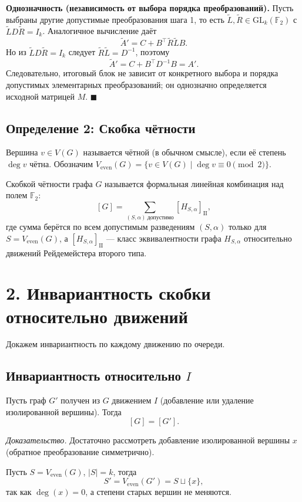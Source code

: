 \documentclass[12pt,a4paper]{article}
\begin{document}
\textbf{Однозначность (независимость от выбора порядка преобразований).}
Пусть выбраны другие допустимые преобразования шага 1, то есть
$\widetilde L,\widetilde R\in\mathrm{GL}_k(\mathbb F_2)$ с
$\widetilde L D\widetilde R=I_k$.
Аналогичное вычисление даёт
\[
\widetilde A' = C + B^\top \widetilde R\widetilde L B.
\]
Но из $\widetilde L D\widetilde R=I_k$ следует
$\widetilde R\widetilde L=D^{-1}$, поэтому
\[
\widetilde A' = C + B^\top D^{-1}B = A'.
\]
Следовательно, итоговый блок не зависит от конкретного выбора и порядка допустимых
элементарных преобразований; он однозначно определяется исходной матрицей $M$.
$\blacksquare$

\subsection*{Определение 2: Скобка чётности}

Вершина $v\in V(G)$ называется чётной (в обычном смысле), если её степень $\deg v$ чётна.
Обозначим $V_{\mathrm{even}}(G)=\{v\in V(G)\mid \deg v\equiv 0\pmod{2}\}$.

Скобкой чётности графа $G$ называется формальная линейная комбинация над полем $\mathbb{F}_2$:
\[
[G]=\sum_{(S,\alpha)\ \text{допустимо}} [H_{S,\alpha}]_{\mathrm{II}},
\]
где сумма берётся по всем допустимым разведениям $(S,\alpha)$ только для $S=V_{\mathrm{even}}(G)$, а $[H_{S,\alpha}]_{\mathrm{II}}$ --- класс эквивалентности графа $H_{S,\alpha}$ относительно движений Рейдемейстера второго типа.

\section*{2. Инвариантность скобки относительно движений}

Докажем инвариантность по каждому движению по очереди.

\subsection*{Инвариантность относительно $I$}

Пусть граф $G'$ получен из $G$ движением $I$ (добавление или удаление изолированной вершины).
Тогда
\[
[G]=[G'].
\]

\textit{Доказательство.}
Достаточно рассмотреть добавление изолированной вершины $x$ (обратное преобразование симметрично).

Пусть $S=V_{\mathrm{even}}(G)$, $|S|=k$, тогда
\[
S'=V_{\mathrm{even}}(G')=S\sqcup\{x\},
\]
так как $\deg(x)=0$, а степени старых вершин не меняются.
\end{document}
